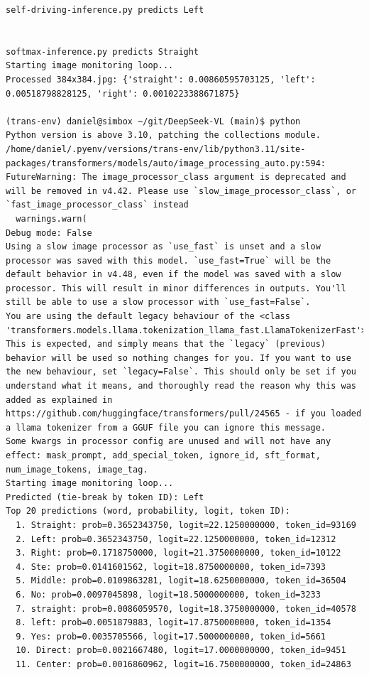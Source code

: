 \begin{verbatim}
self-driving-inference.py predicts Left


softmax-inference.py predicts Straight
Starting image monitoring loop...
Processed 384x384.jpg: {'straight': 0.00860595703125, 'left': 0.00518798828125, 'right': 0.0010223388671875}

(trans-env) daniel@simbox ~/git/DeepSeek-VL (main)$ python 
Python version is above 3.10, patching the collections module.
/home/daniel/.pyenv/versions/trans-env/lib/python3.11/site-packages/transformers/models/auto/image_processing_auto.py:594: FutureWarning: The image_processor_class argument is deprecated and will be removed in v4.42. Please use `slow_image_processor_class`, or `fast_image_processor_class` instead
  warnings.warn(
Debug mode: False
Using a slow image processor as `use_fast` is unset and a slow processor was saved with this model. `use_fast=True` will be the default behavior in v4.48, even if the model was saved with a slow processor. This will result in minor differences in outputs. You'll still be able to use a slow processor with `use_fast=False`.
You are using the default legacy behaviour of the <class 'transformers.models.llama.tokenization_llama_fast.LlamaTokenizerFast'>. This is expected, and simply means that the `legacy` (previous) behavior will be used so nothing changes for you. If you want to use the new behaviour, set `legacy=False`. This should only be set if you understand what it means, and thoroughly read the reason why this was added as explained in https://github.com/huggingface/transformers/pull/24565 - if you loaded a llama tokenizer from a GGUF file you can ignore this message.
Some kwargs in processor config are unused and will not have any effect: mask_prompt, add_special_token, ignore_id, sft_format, num_image_tokens, image_tag. 
Starting image monitoring loop...
Predicted (tie-break by token ID): Left
Top 20 predictions (word, probability, logit, token ID):
  1. Straight: prob=0.3652343750, logit=22.1250000000, token_id=93169
  2. Left: prob=0.3652343750, logit=22.1250000000, token_id=12312
  3. Right: prob=0.1718750000, logit=21.3750000000, token_id=10122
  4. Ste: prob=0.0141601562, logit=18.8750000000, token_id=7393
  5. Middle: prob=0.0109863281, logit=18.6250000000, token_id=36504
  6. No: prob=0.0097045898, logit=18.5000000000, token_id=3233
  7. straight: prob=0.0086059570, logit=18.3750000000, token_id=40578
  8. left: prob=0.0051879883, logit=17.8750000000, token_id=1354
  9. Yes: prob=0.0035705566, logit=17.5000000000, token_id=5661
  10. Direct: prob=0.0021667480, logit=17.0000000000, token_id=9451
  11. Center: prob=0.0016860962, logit=16.7500000000, token_id=24863

\end{verbatim}
